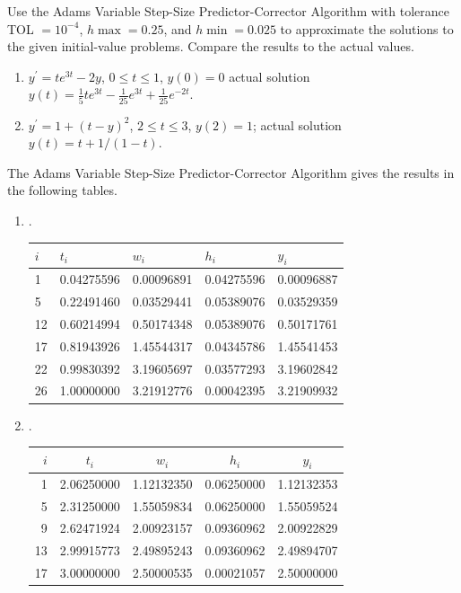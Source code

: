 \begin{myexercise}%
Use the Adams Variable Step-Size Predictor-Corrector Algorithm with tolerance TOL $=10^{-4}$, $h \max =0.25$, and $h \min =0.025$ to approximate the solutions to the given initial-value problems. Compare the results to the actual values.\\
\begin{enumerate}[label=(\alph*)]
\item $y^{\prime}=t e^{3 t}-2 y$, $0 \leq t \leq 1$, $y(0)=0$ actual solution $y(t)=\frac{1}{5} t e^{3 t}-\frac{1}{25} e^{3 t}+\frac{1}{25} e^{-2 t}$.\\
\item $y^{\prime}=1+(t-y)^{2}$, $2 \leq t \leq 3$, $y(2)=1$; actual solution $y(t)=t+1 /(1-t)$.
\end{enumerate}

\begin{mysolution}
The Adams Variable Step-Size Predictor-Corrector Algorithm gives the results in the following tables.\\
\begin{enumerate}[label=(\alph*)]
\item.
\begin{center}
\begin{tabular}{|l|l|l|l|l|}
\hline
$i$ & $t_{i}$ & $w_{i}$ & $h_{i}$ & $y_{i}$ \\
\hline
1 & 0.04275596 & 0.00096891 & 0.04275596 & 0.00096887 \\
\hline
5 & 0.22491460 & 0.03529441 & 0.05389076 & 0.03529359 \\
\hline
12 & 0.60214994 & 0.50174348 & 0.05389076 & 0.50171761 \\
\hline
17 & 0.81943926 & 1.45544317 & 0.04345786 & 1.45541453 \\
\hline
22 & 0.99830392 & 3.19605697 & 0.03577293 & 3.19602842 \\
\hline
26 & 1.00000000 & 3.21912776 & 0.00042395 & 3.21909932 \\
\hline
\end{tabular}
\end{center}
\item.

\begin{center}
\begin{tabular}{rcccc}
\hline
$i$ & $t_{i}$ & $w_{i}$ & $h_{i}$ & $y_{i}$ \\
\hline
1 & 2.06250000 & 1.12132350 & 0.06250000 & 1.12132353 \\
5 & 2.31250000 & 1.55059834 & 0.06250000 & 1.55059524 \\
9 & 2.62471924 & 2.00923157 & 0.09360962 & 2.00922829 \\
13 & 2.99915773 & 2.49895243 & 0.09360962 & 2.49894707 \\
17 & 3.00000000 & 2.50000535 & 0.00021057 & 2.50000000 \\
\hline
\end{tabular}
\end{center}
\end{enumerate}
\end{mysolution}
\end{myexercise}

